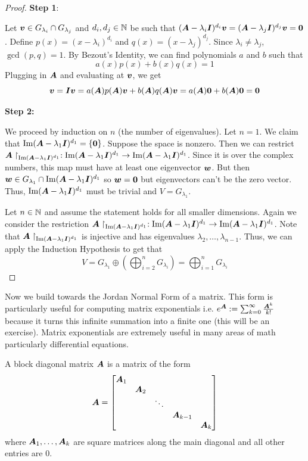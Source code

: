 \begin{proof}
    \textbf{Step 1}:

    Let $\boldsymbol{v}\in G_{\lambda_i}\cap G_{\lambda_j}$ and $d_i,d_j\in\mathbb{N}$ be such that $(\boldsymbol{A}-\lambda_i\boldsymbol{I})^{d_i}\boldsymbol{v}=(\boldsymbol{A}-\lambda_j\boldsymbol{I})^{d_j}\boldsymbol{v}=\boldsymbol{0}$. Define $p(x)=(x-\lambda_i)^{d_i}$ and $q(x)=(x-\lambda_j)^{d_j}$. Since $\lambda_i\neq\lambda_j$, $\gcd(p,q)=1$. By Bezout's Identity, we can find polynomials $a$ and $b$ such that
    \[
    a(x)p(x)+b(x)q(x)=1
    \]
    Plugging in $\boldsymbol{A}$ and evaluating at $\boldsymbol{v}$, we get
    \[
    \boldsymbol{v}=\boldsymbol{I}\boldsymbol{v}=a(\boldsymbol{A})p(\boldsymbol{A})\boldsymbol{v}+b(\boldsymbol{A})q(\boldsymbol{A})\boldsymbol{v}=a(\boldsymbol{A})\boldsymbol{0}+b(\boldsymbol{A})\boldsymbol{0}=\boldsymbol{0}
    \]

    \textbf{Step 2:}

    We proceed by induction on $n$ (the number of eigenvalues). Let $n=1$. We claim that $\operatorname{Im}(\boldsymbol{A}-\lambda_1\boldsymbol{I})^{d_1}=\{\boldsymbol{0}\}$. Suppose the space is nonzero. Then we can restrict $\boldsymbol{A}\restriction_{\operatorname{Im}(\boldsymbol{A}-\lambda_1\boldsymbol{I})^{d_1}}:\operatorname{Im}(\boldsymbol{A}-\lambda_1\boldsymbol{I})^{d_1}\to \operatorname{Im}(\boldsymbol{A}-\lambda_1\boldsymbol{I})^{d_1}$. Since it is over the complex numbers, this map must have at least one eigenvector $\boldsymbol{w}$. But then $\boldsymbol{w}\in G_{\lambda_1}\cap\operatorname{Im}(\boldsymbol{A}-\lambda_1\boldsymbol{I})^{d_1}$ so $\boldsymbol{w}=\boldsymbol{0}$ but eigenvectors can't be the zero vector. Thus, $\operatorname{Im}(\boldsymbol{A}-\lambda_1\boldsymbol{I})^{d_1}$ must be trivial and $V=G_{\lambda_1}$.

    Let $n\in\mathbb{N}$ and assume the statement holds for all smaller dimensions. Again we consider the restriction $\boldsymbol{A}\restriction_{\operatorname{Im}(\boldsymbol{A}-\lambda_1\boldsymbol{I})^{d_1}}:\operatorname{Im}(\boldsymbol{A}-\lambda_1\boldsymbol{I})^{d_1}\to \operatorname{Im}(\boldsymbol{A}-\lambda_1\boldsymbol{I})^{d_1}$. Note that $\boldsymbol{A}\restriction_{\operatorname{Im}(\boldsymbol{A}-\lambda_1\boldsymbol{I})^{d_1}}$ is injective and has eigenvalues $\lambda_2,\dots,\lambda_{n-1}$. Thus, we can apply the Induction Hypothesis to get that
    \[
    V=G_{\lambda_1}\oplus\left(\bigoplus_{i=2}^nG_{\lambda_i}\right)=\bigoplus_{i=1}^nG_{\lambda_i}
    \]
\end{proof}
Now we build towards the Jordan Normal Form of a matrix. This form is particularly useful for computing matrix exponentials i.e. $e^{\boldsymbol{A}}:=\sum_{k=0}^\infty\frac{\boldsymbol{A}^k}{k!}$ because it turns this infinite summation into a finite one (this will be an exercise). Matrix exponentials are extremely useful in many areas of math particularly differential equations.
\begin{definition}
    A block diagonal matrix $\boldsymbol{A}$ is a matrix of the form
    \[
    \boldsymbol{A}=\begin{bmatrix}
        \boldsymbol{A}_1 & & & \\
        & \boldsymbol{A}_2 & & \\
        & & \ddots & \\
        & & & \boldsymbol{A}_{k-1} & \\
        & & & & \boldsymbol{A}_k
    \end{bmatrix}
    \]
    where $\boldsymbol{A}_1,\dots,\boldsymbol{A}_k$ are square matrices along the main diagonal and all other entries are $0$.
\end{definition}

